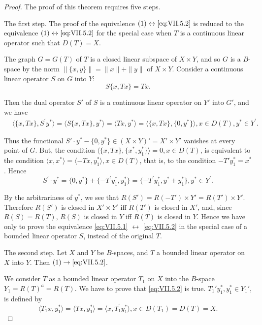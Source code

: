 \begin{proof}
 The proof of this theorem requires five steps. 


The first step. The proof of the equivalence $(1) \leftrightarrow \eqref{eq:VII.5.2}$ is reduced to the equivalence $(1) \leftrightarrow \eqref{eq:VII.5.2}$ for the special case when $T$ is a continuous linear operator such that $D(T) = X$. 

The graph $G = G(T)$ of $T$ is a closed linear subspace of $X \times Y$, and so $G$ is a $B$-space by the norm $\|\{x, y\}\| = \|x\| + \|y\|$ of $X \times Y$. Consider a continuous linear operator $S$ on $G$ into $Y$: 
\[
S \{x, T x \} = T x.
\]

Then the dual operator $S'$ of $S$ is a continuous linear operator on $Y'$ into $G'$, and we have 
\[
\begin{aligned}
&\langle \{x, T x \}, S ^{\prime} y ^{*} \rangle  = \langle S \{x, T x \}, y ^{*} \rangle = \langle T x, y ^{*} \rangle = \langle \{x, T x \}, \{0, y ^{*} \} \rangle , x \in D (T), y ^{*} \in Y ^{\prime}.
\end{aligned}
\]

Thus the functional $S' \cdot y^* - \{0, y^*\} \in (X \times Y)' = X' \times Y'$ vanishes at every point of $G$. But, the condition $\langle \{x, Tx\}, \{x^*, y_1^*\} \rangle = 0, x \in D(T)$, is equivalent to the condition $\langle x, x^* \rangle = \langle -Tx, y_1^* \rangle, x \in D(T)$, that is, to the condition $-T' y_1^* = x^*$. Hence 
\[
S ^{\prime} \cdot y ^{*} = \{0, y ^{*} \} + \{- T ^{\prime} y _{1} ^{*}, y _{1} ^{*} \} = \{- T ^{\prime} y _{1} ^{*}, y ^{*} + y _{1} ^{*} \}, y ^{*} \in Y ^{\prime}.
\]

By the arbitrariness of $y^*$, we see that $R(S') = R(-T') \times Y' = R(T') \times Y'$. Therefore $R(S')$ is closed in $X' \times Y'$ iff $R(T')$ is closed in $X'$, and, since $R(S) = R(T)$, $R(S)$ is closed in $Y$ iff $R(T)$ is closed in $Y$. Hence we have only to prove the equivalence \eqref{eq:VII.5.1} $\leftrightarrow$ \eqref{eq:VII.5.2} in the special case of a bounded linear operator $S$, instead of the original $T$. 

The second step. Let $X$ and $Y$ be $B$-spaces, and $T$ a bounded linear operator on $X$ into $Y$. Then $(1) \rightarrow \eqref{eq:VII.5.2}$. 

We consider $T$ as a bounded linear operator $T_{1}$ on $X$ into the $B$-space $Y_{1} = R(T)^{a} = R(T)$. We have to prove that \eqref{eq:VII.5.2} is true. $T_{1}'y_{1}^{*}, y_{1}^{*} \in Y_{1}'$, is defined by 
\[
\langle T _{1} x, y _{1} ^{*} \rangle = \langle T x, y _{1} ^{*} \rangle = \langle x, T _{1} ^{\prime} y _{1} ^{*} \rangle , x \in D (T _{1}) = D (T) = X.
\]


\end{proof}

